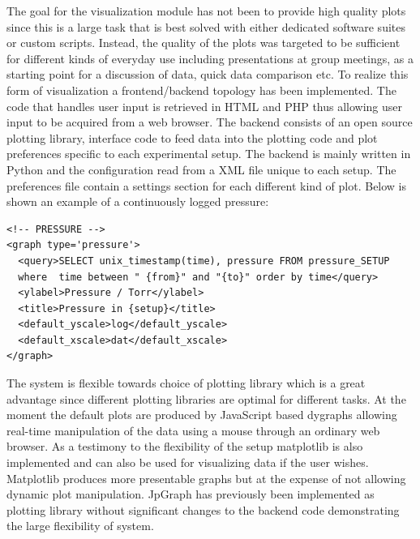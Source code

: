 The goal for the visualization module has not been to provide high quality
plots since this is a large task that is best solved with either dedicated
software suites or custom scripts. Instead, the quality of the plots was
targeted to be sufficient for different kinds of everyday use including
presentations at group meetings, as a starting point for a discussion of data,
quick data comparison etc. To realize this form of visualization a
frontend/backend topology has been implemented. The code that handles user
input is retrieved in HTML and PHP thus allowing user input to be acquired from
a web browser. The backend consists of an open source plotting library,
interface code to feed data into the plotting code and plot preferences
specific to each experimental setup. The backend is mainly written in Python
and the configuration read from a XML file unique to each setup. The
preferences file contain a settings section for each different kind of plot.
Below is shown an example of a continuously logged pressure:

\begin{verbatim} 
<!-- PRESSURE --> 
<graph type='pressure'>
  <query>SELECT unix_timestamp(time), pressure FROM pressure_SETUP
  where  time between " {from}" and "{to}" order by time</query>
  <ylabel>Pressure / Torr</ylabel>
  <title>Pressure in {setup}</title>
  <default_yscale>log</default_yscale>
  <default_xscale>dat</default_xscale>
</graph>
\end{verbatim}

The system is flexible towards choice of plotting library which is a great
advantage since different plotting libraries are optimal for different tasks.
At the moment the default plots are produced by JavaScript based
dygraphs\cite{dygraphs} allowing real-time manipulation of the data using a
mouse through an ordinary web browser. As a testimony to the flexibility of the
setup matplotlib\cite{matplotlib} is also implemented and can also be used for
visualizing data if the user wishes. Matplotlib produces more presentable
graphs but at the expense of not allowing dynamic plot manipulation.
JpGraph\cite{jpgraph} has previously been implemented as plotting library
without significant changes to the backend code demonstrating the large
flexibility of system.
